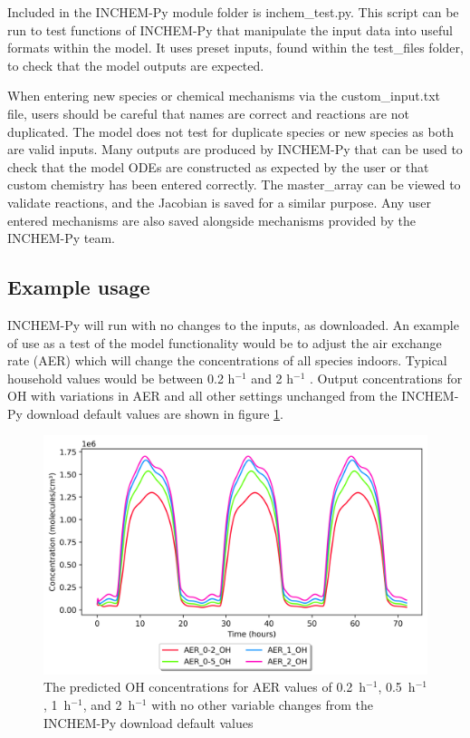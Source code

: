 \documentclass[a4paper]{refart}
\begin{document}
Included in the INCHEM-Py module folder is inchem\_test.py. This script can be run to test functions of INCHEM-Py that manipulate the input data into useful formats within the model. It uses preset inputs, found within the test\_files folder, to check that the model outputs are expected.

When entering new species or chemical mechanisms via the custom\_input.txt file, users should be careful that names are correct and reactions are not duplicated. The model does not test for duplicate species or new species as both are valid inputs. Many outputs are produced by INCHEM-Py that can be used to check that the model ODEs are constructed as expected by the user or that custom chemistry has been entered correctly. The master\_array can be viewed to validate reactions, and the Jacobian is saved for a similar purpose. Any user entered mechanisms are also saved alongside mechanisms provided by the INCHEM-Py team.

\subsection{Example usage}
INCHEM-Py will run with no changes to the inputs, as downloaded. An example of use as a test of the model functionality would be to adjust the air exchange rate (AER) which will change the concentrations of all species indoors. Typical household values would be between 0.2 h$^{-1}$ and 2 h$^{-1}$ \cite{Weschler2000}.  Output concentrations for OH with variations in AER and all other settings unchanged from the INCHEM-Py download default values are shown in figure \ref{fig:OH_AER}.
\begin{figure}[h]
    \centering
    \includegraphics[width=\textwidth]{OH_AER.png}
    \caption{The predicted OH concentrations for AER values of 0.2~h$^{-1}$, 0.5~h$^{-1}$, 1~h$^{-1}$, and 2~h$^{-1}$ with no other variable changes from the INCHEM-Py download default values}
    \label{fig:OH_AER}
\end{figure}
\end{document}
